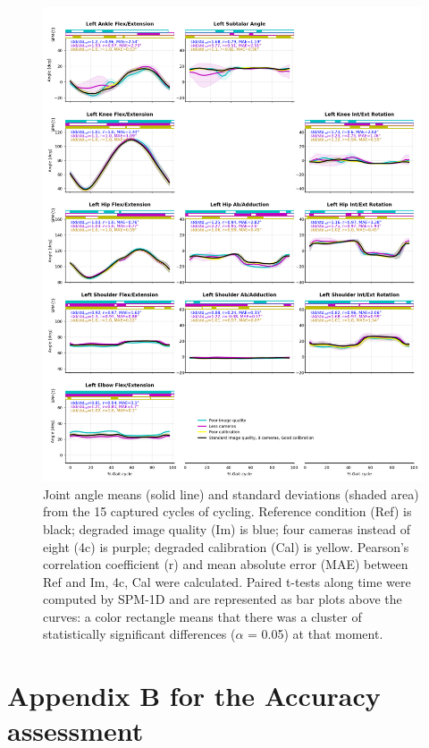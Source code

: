 \begin{figure}[!ht]
	\centering
	\def\svgwidth{1\columnwidth}
	\fontsize{10pt}{10pt}\selectfont
	\includegraphics[height=\dimexpr\textheight-119pt]{"../Annexes/Figures/Fig_BikeRobust.png"}
	\caption{Joint angle means (solid line) and standard deviations (shaded area) from the 15 captured cycles of cycling. Reference condition (Ref) is black; degraded image quality (Im) is blue; four cameras instead of eight (4c) is purple; degraded calibration (Cal) is yellow. Pearson’s correlation coefficient (r) and mean absolute error (MAE) between Ref and Im, 4c, Cal were calculated. Paired t-tests along time were computed by SPM-1D and are represented as bar plots above the curves: a color rectangle means that there was a cluster of statistically significant differences (\(\alpha\) = 0.05) at that moment.}
	\label{fig_bikerobust}
\end{figure}


\FloatBarrier
\chapter{Appendix B  for the Accuracy assessment}
\label{Ann:2}

